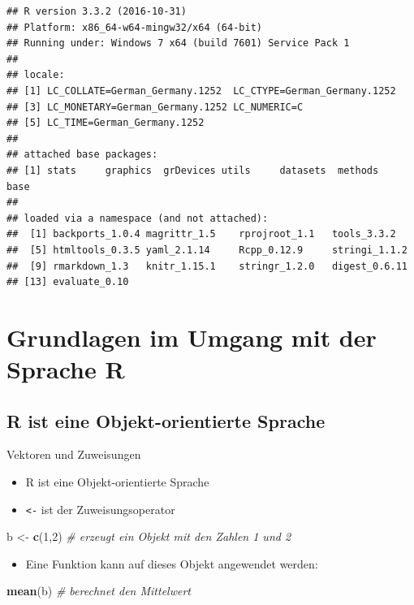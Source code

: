 \documentclass[]{article}
\newenvironment{Shaded}{\begin{snugshade}}{\end{snugshade}}
\newcommand{\KeywordTok}[1]{\textcolor[rgb]{0.13,0.29,0.53}{\textbf{{#1}}}}
\newcommand{\DecValTok}[1]{\textcolor[rgb]{0.00,0.00,0.81}{{#1}}}
\newcommand{\StringTok}[1]{\textcolor[rgb]{0.31,0.60,0.02}{{#1}}}
\newcommand{\CommentTok}[1]{\textcolor[rgb]{0.56,0.35,0.01}{\textit{{#1}}}}
\newcommand{\NormalTok}[1]{{#1}}
\providecommand{\tightlist}{%
  \setlength{\itemsep}{0pt}\setlength{\parskip}{0pt}}
\begin{document}
\begin{verbatim}
## R version 3.3.2 (2016-10-31)
## Platform: x86_64-w64-mingw32/x64 (64-bit)
## Running under: Windows 7 x64 (build 7601) Service Pack 1
## 
## locale:
## [1] LC_COLLATE=German_Germany.1252  LC_CTYPE=German_Germany.1252   
## [3] LC_MONETARY=German_Germany.1252 LC_NUMERIC=C                   
## [5] LC_TIME=German_Germany.1252    
## 
## attached base packages:
## [1] stats     graphics  grDevices utils     datasets  methods   base     
## 
## loaded via a namespace (and not attached):
##  [1] backports_1.0.4 magrittr_1.5    rprojroot_1.1   tools_3.3.2    
##  [5] htmltools_0.3.5 yaml_2.1.14     Rcpp_0.12.9     stringi_1.1.2  
##  [9] rmarkdown_1.3   knitr_1.15.1    stringr_1.2.0   digest_0.6.11  
## [13] evaluate_0.10
\end{verbatim}

\section{Grundlagen im Umgang mit der Sprache
R}\label{grundlagen-im-umgang-mit-der-sprache-r}

\subsection{R ist eine Objekt-orientierte
Sprache}\label{r-ist-eine-objekt-orientierte-sprache}

Vektoren und Zuweisungen

\begin{itemize}
\tightlist
\item
  R ist eine Objekt-orientierte Sprache
\item
  \texttt{\textless{}-} ist der Zuweisungsoperator
\end{itemize}

\begin{Shaded}
\begin{Highlighting}[]
\NormalTok{b <-}\StringTok{ }\KeywordTok{c}\NormalTok{(}\DecValTok{1}\NormalTok{,}\DecValTok{2}\NormalTok{) }\CommentTok{# erzeugt ein Objekt mit den Zahlen 1 und 2}
\end{Highlighting}
\end{Shaded}

\begin{itemize}
\tightlist
\item
  Eine Funktion kann auf dieses Objekt angewendet werden:
\end{itemize}

\begin{Shaded}
\begin{Highlighting}[]
\KeywordTok{mean}\NormalTok{(b) }\CommentTok{# berechnet den Mittelwert}
\end{Highlighting}
\end{Shaded}
\end{document}
